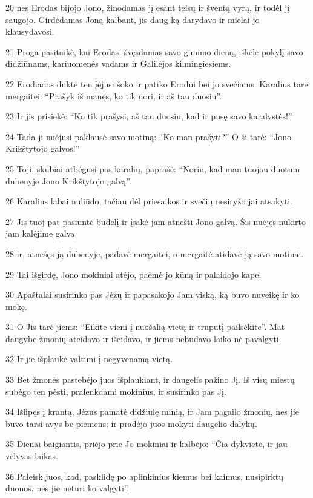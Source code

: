 \par 20 nes Erodas bijojo Jono, žinodamas jį esant teisų ir šventą vyrą, ir todėl jį saugojo. Girdėdamas Joną kalbant, jis daug ką darydavo ir mielai jo klausydavosi. 
\par 21 Proga pasitaikė, kai Erodas, švęsdamas savo gimimo dieną, iškėlė pokylį savo didžiūnams, kariuomenės vadams ir Galilėjos kilmingiesiems. 
\par 22 Erodiados duktė ten įėjusi šoko ir patiko Erodui bei jo svečiams. Karalius tarė mergaitei: “Prašyk iš manęs, ko tik nori, ir aš tau duosiu”. 
\par 23 Ir jis prisiekė: “Ko tik prašysi, aš tau duosiu, kad ir pusę savo karalystės!” 
\par 24 Tada ji nuėjusi paklausė savo motiną: “Ko man prašyti?” O ši tarė: “Jono Krikštytojo galvos!” 
\par 25 Toji, skubiai atbėgusi pas karalių, paprašė: “Noriu, kad man tuojau duotum dubenyje Jono Krikštytojo galvą”. 
\par 26 Karalius labai nuliūdo, tačiau dėl priesaikos ir svečių nesiryžo jai atsakyti. 
\par 27 Jis tuoj pat pasiuntė budelį ir įsakė jam atnešti Jono galvą. Šis nuėjęs nukirto jam kalėjime galvą 
\par 28 ir, atnešęs ją dubenyje, padavė mergaitei, o mergaitė atidavė ją savo motinai. 
\par 29 Tai išgirdę, Jono mokiniai atėjo, paėmė jo kūną ir palaidojo kape. 
\par 30 Apaštalai susirinko pas Jėzų ir papasakojo Jam viską, ką buvo nuveikę ir ko mokę. 
\par 31 O Jis tarė jiems: “Eikite vieni į nuošalią vietą ir truputį pailsėkite”. Mat daugybė žmonių ateidavo ir išeidavo, ir jiems nebūdavo laiko nė pavalgyti. 
\par 32 Ir jie išplaukė valtimi į negyvenamą vietą. 
\par 33 Bet žmonės pastebėjo juos išplaukiant, ir daugelis pažino Jį. Iš visų miestų subėgo ten pėsti, pralenkdami mokinius, ir susirinko pas Jį. 
\par 34 Išlipęs į krantą, Jėzus pamatė didžiulę minią, ir Jam pagailo žmonių, nes jie buvo tarsi avys be piemens; ir pradėjo juos mokyti daugelio dalykų. 
\par 35 Dienai baigiantis, priėjo prie Jo mokiniai ir kalbėjo: “Čia dykvietė, ir jau vėlyvas laikas. 
\par 36 Paleisk juos, kad, pasklidę po aplinkinius kiemus bei kaimus, nusipirktų duonos, nes jie neturi ko valgyti”. 
